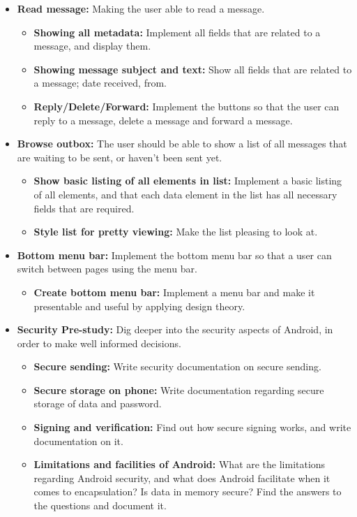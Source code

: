 \begin{itemize}
\item{}\textbf{Read message:} Making the user able to read a message.
\begin{itemize}
\item{}\textbf{Showing all metadata:} Implement all fields that are related to a message, and display them.
\item{}\textbf{Showing message subject and text:} Show all fields that are related to a message; date received, from.
\item{}\textbf{Reply/Delete/Forward:} Implement the buttons so that the user can reply to a message, delete a message and forward a message.
\end{itemize}
\item{}\textbf{Browse outbox:} The user should be able to show a list of all messages that are waiting to be sent, or haven’t been sent yet.
\begin{itemize}
\item{}\textbf{Show basic listing of all elements in list:} Implement a basic listing of all elements, and that each data element in the list has all necessary fields that are required.
\item{}\textbf{Style list for pretty viewing:} Make the list pleasing to look at.
\end{itemize}
\item{}\textbf{Bottom menu bar:} Implement the bottom menu bar so that a user can switch between pages using the menu bar.
\begin{itemize}
\item{}\textbf{Create bottom menu bar:} Implement a menu bar and make it presentable and useful by applying design theory.
\end{itemize}
\item{}\textbf{Security Pre-study:} Dig deeper into the security aspects of Android, in order to make well informed decisions.
\begin{itemize}
\item{}\textbf{Secure sending:} Write security documentation on secure sending.
\item{}\textbf{Secure storage on phone:} Write documentation regarding secure storage of data and password.
\item{}\textbf{Signing and verification:} Find out how secure signing works, and write documentation on it.
\item{}\textbf{Limitations and facilities of Android:} What are the limitations regarding Android security, and what does Android facilitate when it comes to encapsulation? Is data in memory secure? Find the answers to the questions and document it.

\end{itemize}
\end{itemize}
